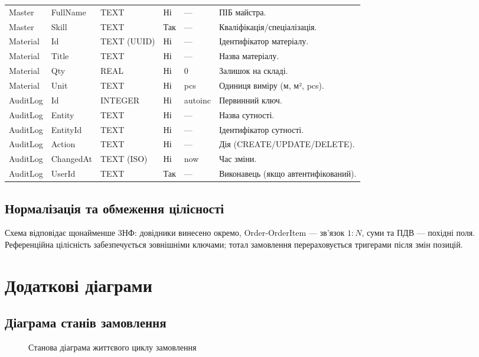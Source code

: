 \documentclass[14pt,a4paper]{extarticle}
\begin{document}
\begin{longtable}{@{}p{2.8cm} p{3.2cm} p{3.2cm} p{2.0cm} p{3.2cm} p{8.2cm}@{}}
Master & FullName & TEXT & Ні & — & ПІБ майстра. \\
Master & Skill & TEXT & Так & — & Кваліфікація/спеціалізація. \\
\addlinespace
Material & Id & TEXT (UUID) & Ні & — & Ідентифікатор матеріалу. \\
Material & Title & TEXT & Ні & — & Назва матеріалу. \\
Material & Qty & REAL & Ні & 0 & Залишок на складі. \\
Material & Unit & TEXT & Ні & pcs & Одиниця виміру (м, м², pcs). \\
\addlinespace
AuditLog & Id & INTEGER & Ні & autoinc & Первинний ключ. \\
AuditLog & Entity & TEXT & Ні & — & Назва сутності. \\
AuditLog & EntityId & TEXT & Ні & — & Ідентифікатор сутності. \\
AuditLog & Action & TEXT & Ні & — & Дія (CREATE/UPDATE/DELETE). \\
AuditLog & ChangedAt & TEXT (ISO) & Ні & now & Час зміни. \\
AuditLog & UserId & TEXT & Так & — & Виконавець (якщо автентифікований). \\
\bottomrule
\end{longtable}

\subsection{Нормалізація та обмеження цілісності}
Схема відповідає щонайменше 3НФ: довідники винесено окремо, \mbox{Order-OrderItem} — зв’язок \(1\!:\!N\), суми та ПДВ — похідні поля. Референційна цілісність забезпечується зовнішніми ключами; тотал замовлення перераховується тригерами після змін позицій.

\clearpage

\section{Додаткові діаграми}
\subsection{Діаграма станів замовлення}
\begin{figure}[H]
  \centering
  \caption{Станова діаграма життєвого циклу замовлення}
\end{figure}
\end{document}

